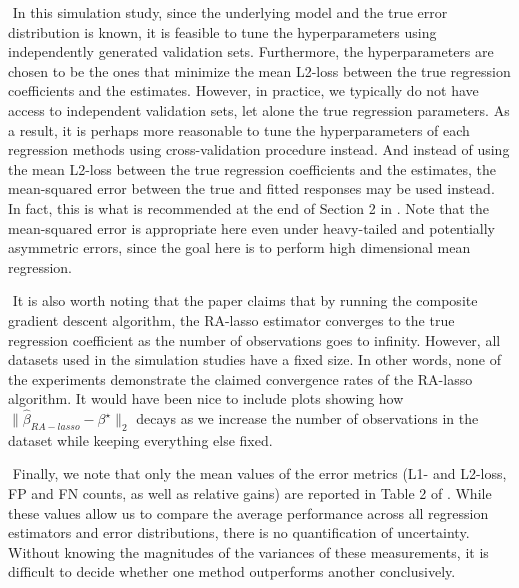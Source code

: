 $ $\newline
In this simulation study, since the underlying model and the true error distribution is known, it is feasible to tune the hyperparameters using independently generated validation sets. Furthermore, the hyperparameters are chosen to be the ones that minimize the mean L2-loss between the true regression coefficients and the estimates. However, in practice, we typically do not have access to independent validation sets, let alone the true regression parameters. As a result, it is perhaps more reasonable to tune the hyperparameters of each regression methods using cross-validation procedure instead. And instead of using the mean L2-loss between the true regression coefficients and the estimates, the mean-squared error between the true and fitted responses may be used instead. In fact, this is what is recommended at the end of Section 2 in \citet{fan2017estimation}. Note that the mean-squared error is appropriate here even under heavy-tailed and potentially asymmetric errors, since the goal here is to perform high dimensional mean regression.

$ $\newline
It is also worth noting that the paper claims that by running the composite gradient descent algorithm, the RA-lasso estimator converges to the true regression coefficient as the number of observations goes to infinity. However, all datasets used in the simulation studies have a fixed size. In other words, none of the experiments demonstrate the claimed convergence rates of the RA-lasso algorithm. It would have been nice to include plots showing how $\| \hat{\beta}_{RA-lasso} - \beta^\star \|_2$ decays as we increase the number of observations in the dataset while keeping everything else fixed.

$ $\newline
Finally, we note that only the mean values of the error metrics (L1- and L2-loss, FP and FN counts, as well as relative gains) are reported in Table 2 of \citet{fan2017estimation}. While these values allow us to compare the average performance across all regression estimators and error distributions, there is no quantification of uncertainty. Without knowing the magnitudes of the variances of these measurements, it is difficult to decide whether one method outperforms another conclusively.